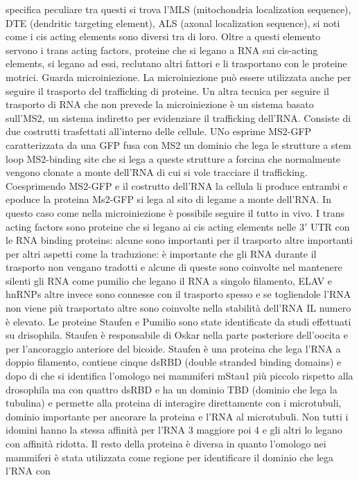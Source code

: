 specifica peculiare tra questi si trova l'MLS (mitochondria localization sequence), DTE (dendritic targeting element), ALS (axonal localization sequence), si noti come i cis acting 
elements sono diversi tra di loro. Oltre a questi elemento servono i trans acting factors, proteine che si legano a RNA sui cis-acting elements, si legano ad essi, reclutano altri 
fattori e li trasportano con le proteine motrici. Guarda microiniezione. La microiniezione pu\`o essere utilizzata anche per seguire il trasporto del trafficking di proteine.
Un altra tecnica per seguire il trasporto di RNA che non prevede la microiniezione \`e un sistema basato sull'MS2, un sistema indiretto per evidenziare il trafficking dell'RNA. Consiste
di due costrutti trasfettati all'interno delle cellule. UNo esprime MS2-GFP caratterizzata da una GFP fusa con MS2 un dominio che lega le strutture a stem loop MS2-binding site che si 
lega a queste strutture a forcina che normalmente vengono clonate a monte dell'RNA di cui si vole tracciare il trafficking. Coesprimendo MS2-GFP e il costrutto dell'RNA la cellula li 
produce entrambi e epoduce la proteina Ms2-GFP si lega al sito di legame a monte dell'RNA. In questo caso come nella microiniezione \`e possibile seguire il tutto in vivo. I trans 
acting factors sono proteine che si legano ai cis acting elements nelle $3'$ UTR con le RNA binding proteins: alcune sono importanti per il trasporto altre importanti per altri aspetti
come la traduzione: \`e importante che gli RNA durante il trasporto non vengano tradotti e alcune di queste sono coinvolte nel mantenere silenti gli RNA come pumilio che legano il RNA
a singolo filamento, ELAV e hnRNPs altre invece sono connesse con il trasporto spesso e se togliendole l'RNA non viene pi\`u trasportato altre sono coinvolte nella stabilit\`a dell'RNA
IL numero \`e elevato. Le proteine Staufen e Pumilio sono state identificate da studi effettuati su drisophila. Staufen \`e responsabile di Oskar nella parte posteriore dell'oocita
e per l'ancoraggio anteriore del bicoide. Staufen \`e una proteina che lega l'RNA a doppio filamento, contiene cinque dsRBD (double stranded binding domains) e dopo di che si identifica
l'omologo nei mammiferi mStau1 pi\`u piccolo rispetto alla drosophila ma con quattro dsRBD e ha un dominio TBD (dominio che lega la tubulina) e permette alla proteina di interagire 
direttamente con i microtubuli, dominio importante per ancorare la proteina e l'RNA al microtubuli. Non  tutti i idomini hanno la stessa affinit\`a per l'RNA 3 maggiore poi 4 e gli altri
lo legano con affinit\`a ridotta. Il resto della proteina \`e diversa in quanto l'omologo nei mammiferi \`e stata utilizzata come regione per identificare il dominio che lega l'RNA con
